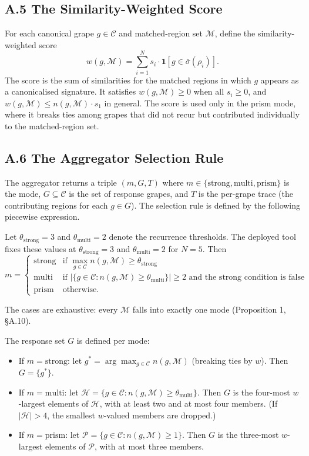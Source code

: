 \documentclass[11pt]{article}
\providecommand{\indicator}{\mathbf{1}}
\begin{document}
\subsection*{A.5 The Similarity-Weighted Score}
For each canonical grape $g \in \mathcal{C}$ and matched-region set $\mathcal{M}$, define the similarity-weighted score
\[
w(g, \mathcal{M}) = \sum_{i=1}^{N} s_i \cdot \indicator[g \in \bar\sigma(\rho_i)].
\]
The score is the sum of similarities for the matched regions in which $g$ appears as a canonicalised signature. It satisfies $w(g, \mathcal{M}) \geq 0$ when all $s_i \geq 0$, and $w(g, \mathcal{M}) \leq n(g, \mathcal{M}) \cdot s_1$ in general. The score is used only in the prism mode, where it breaks ties among grapes that did not recur but contributed individually to the matched-region set.

\subsection*{A.6 The Aggregator Selection Rule}
The aggregator returns a triple $(m, G, T)$ where $m \in \{\mathrm{strong}, \mathrm{multi}, \mathrm{prism}\}$ is the mode, $G \subseteq \mathcal{C}$ is the set of response grapes, and $T$ is the per-grape trace (the contributing regions for each $g \in G$). The selection rule is defined by the following piecewise expression.

Let $\theta_{\mathrm{strong}} = 3$ and $\theta_{\mathrm{multi}} = 2$ denote the recurrence thresholds. The deployed tool fixes these values at $\theta_{\mathrm{strong}} = 3$ and $\theta_{\mathrm{multi}} = 2$ for $N = 5$. Then
\[
m =
\begin{cases}
\mathrm{strong} & \text{if } \max_{g \in \mathcal{C}} n(g, \mathcal{M}) \geq \theta_{\mathrm{strong}} \\
\mathrm{multi}  & \text{if } | \{ g \in \mathcal{C} : n(g, \mathcal{M}) \geq \theta_{\mathrm{multi}} \} | \geq 2 \text{ and the strong condition is false} \\
\mathrm{prism}  & \text{otherwise.}
\end{cases}
\]

The cases are exhaustive: every $\mathcal{M}$ falls into exactly one mode (Proposition 1, \S A.10).

The response set $G$ is defined per mode:

\begin{itemize}[leftmargin=2em,itemsep=0.2em]
\item If $m = \mathrm{strong}$: let $g^{*} = \arg\max_{g \in \mathcal{C}} n(g, \mathcal{M})$ (breaking ties by $w$). Then $G = \{ g^{*} \}$.
\item If $m = \mathrm{multi}$: let $\mathcal{H} = \{ g \in \mathcal{C} : n(g, \mathcal{M}) \geq \theta_{\mathrm{multi}} \}$. Then $G$ is the four-most $w$-largest elements of $\mathcal{H}$, with at least two and at most four members. (If $|\mathcal{H}| > 4$, the smallest $w$-valued members are dropped.)
\item If $m = \mathrm{prism}$: let $\mathcal{P} = \{ g \in \mathcal{C} : n(g, \mathcal{M}) \geq 1 \}$. Then $G$ is the three-most $w$-largest elements of $\mathcal{P}$, with at most three members.
\end{itemize}
\end{document}
